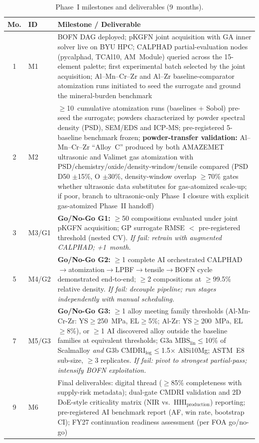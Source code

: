 \documentclass[11pt,letterpaper]{article}
\begin{document}
\begin{table}[H]
\centering\footnotesize
\caption{Phase~I milestones and deliverables (9~months).}
\label{tab:milestones}
\setlength{\tabcolsep}{3pt}
\begin{tabularx}{\textwidth}{clX}
\toprule
\textbf{Mo.} & \textbf{ID} & \textbf{Milestone / Deliverable} \\
\midrule
1 & M1 & BOFN DAG deployed; pKGFN joint acquisition with GA inner solver live on BYU HPC; CALPHAD partial-evaluation nodes (pycalphad, TCAl10, AM~Module) queried across the 15-element palette; first experimental batch selected by the joint acquisition; Al--Mn--Cr--Zr and Al--Zr baseline-comparator atomization runs initiated to seed the surrogate and ground the mineral-burden benchmark \\
2 & M2 & $\geq$10~cumulative atomization runs (baselines + Sobol) pre-seed the surrogate; powders characterized by powder spectral density (PSD), SEM/EDS and ICP-MS; pre-registered 5-baseline benchmark frozen; \textbf{powder-transfer validation:} Al--Mn--Cr--Zr ``Alloy~C'' produced by both AMAZEMET ultrasonic and Valimet gas atomization with PSD/chemistry/oxide/density-window/tensile compared (PSD D50 $\pm$15\%, O $\pm$30\%, density-window overlap $\geq$70\% gates whether ultrasonic data substitutes for gas-atomized scale-up; if poor, branch to ultrasonic-only Phase~I closure with explicit gas-atomized Phase~II handoff) \\
3 & M3/G1 & \textbf{Go/No-Go G1:} $\geq$50 compositions evaluated under joint pKGFN acquisition; GP surrogate RMSE $<$ pre-registered threshold (nested CV). \textit{If fail: retrain with augmented CALPHAD; +1~month.} \\
5 & M4/G2 & \textbf{Go/No-Go G2:} $\geq$1 complete AI orchestrated CALPHAD$\to$atomization$\to$LPBF$\to$tensile$\to$BOFN cycle demonstrated end-to-end; $\geq$2 compositions at $\geq$99.5\% relative density. \textit{If fail: decouple pipeline; run stages independently with manual scheduling.} \\
7 & M5/G3 & \textbf{Go/No-Go G3:} $\geq$1 alloy meeting family thresholds (Al-Mn-Cr-Zr: YS$\geq$250~MPa, EL$\geq$5\%; Al-Zr: YS$\geq$200~MPa, EL$\geq$8\%), or $\geq$1 AI discovered alloy outside the baseline families at equivalent thresholds; G3a $\mathrm{MBS}_\text{lin}\leq$10\% of Scalmalloy \emph{and} G3b $\mathrm{CMDRI}_\text{log}\leq$1.5$\times$ AlSi10Mg; ASTM~E8 sub-size, $\geq$3 replicates. \textit{If fail: pivot to strongest partial-pass; intensify BOFN exploitation.} \\
9 & M6 & Final deliverables: digital thread ($\geq$85\% completeness with supply-risk metadata); dual-gate CMDRI validation and 2D DoE-style criticality matrix (NIR vs.\ $\mathrm{HHI}_\text{production}$) reporting; pre-registered AI benchmark report (AF, win rate, bootstrap CI); FY27 continuation readiness assessment (per FOA go/no-go) \\
\bottomrule
\end{tabularx}
\end{table}
\end{document}
